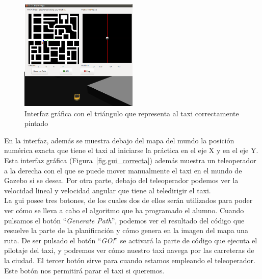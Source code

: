 \begin{figure}[H]
  \begin{center}
    \includegraphics[width=0.5\textwidth]{figures/GPP/triangulo_giro_correcto.png}
		\caption{Interfaz gráfica con el triángulo que representa al taxi correctamente pintado}
		\label{fig.triangulo_giro_correcto}
		\end{center}
\end{figure}

En la interfaz, además se muestra debajo del mapa del mundo la posición numérica exacta que tiene el taxi al iniciarse la práctica en el eje X y en el eje Y. Esta interfaz gráfica (Figura~\ref{fig.gui_correcta}) además muestra un teleoperador a la derecha con el que se puede mover manualmente el taxi en el mundo de Gazebo si se desea.  Por otra parte, debajo del teleoperador podemos ver la velocidad lineal y velocidad angular que tiene al teledirigir el taxi.\\

La \acrshort{gui} posee tres botones, de los cuales dos de ellos serán utilizados para poder ver cómo se lleva a cabo el algoritmo que ha programado el alumno. Cuando pulsamos el botón ``\textit{Generate Path}'', podemos ver el resultado del código que resuelve la parte de la planificación y cómo genera en la imagen del mapa una ruta. De ser pulsado el botón ``\textit{GO!}'' se activará la parte de código que ejecuta el pilotaje del taxi, y podremos ver cómo nuestro taxi navega por las carreteras de la ciudad. El tercer botón sirve para cuando estamos empleando el teleoperador. Este botón nos permitirá parar el taxi si queremos.\\

